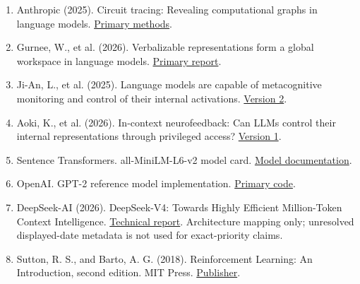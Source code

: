 \documentclass[11pt,letterpaper]{article}
\begin{document}
\begin{enumerate}[label=\arabic*.,itemsep=0.35em]
\item\label{ref:9}\begingroup{} Anthropic (2025). Circuit tracing: Revealing computational graphs in language models. \href{https://transformer-circuits.pub/2025/attribution-graphs/methods.html}{Primary methods}.\par\endgroup
\item\label{ref:10}\begingroup{} Gurnee, W., et al. (2026). Verbalizable representations form a global workspace in language models. \href{https://transformer-circuits.pub/2026/workspace/index.html}{Primary report}.\par\endgroup
\item\label{ref:11}\begingroup{} Ji-An, L., et al. (2025). Language models are capable of metacognitive monitoring and control of their internal activations. \href{https://arxiv.org/html/2505.13763v2}{Version 2}.\par\endgroup
\item\label{ref:12}\begingroup{} Aoki, K., et al. (2026). In-context neurofeedback: Can LLMs control their internal representations through privileged access? \href{https://arxiv.org/html/2609.00904v1}{Version 1}.\par\endgroup
\item\label{ref:13}\begingroup{} Sentence Transformers. all-MiniLM-L6-v2 model card. \href{https://huggingface.co/sentence-transformers/all-MiniLM-L6-v2}{Model documentation}.\par\endgroup
\item\label{ref:14}\begingroup{} OpenAI. GPT-2 reference model implementation. \href{https://raw.githubusercontent.com/openai/gpt-2/master/src/model.py}{Primary code}.\par\endgroup
\item\label{ref:15}\begingroup{} DeepSeek-AI (2026). DeepSeek-V4: Towards Highly Efficient Million-Token Context Intelligence. \href{https://arxiv.org/html/2606.19348v1}{Technical report}. Architecture mapping only; unresolved displayed-date metadata is not used for exact-priority claims.\par\endgroup
\item\label{ref:16}\begingroup{} Sutton, R. S., and Barto, A. G. (2018). Reinforcement Learning: An Introduction, second edition. MIT Press. \href{https://mitpress.mit.edu/9780262039246/reinforcement-learning/}{Publisher}.\par\endgroup

\end{enumerate}
\end{document}
